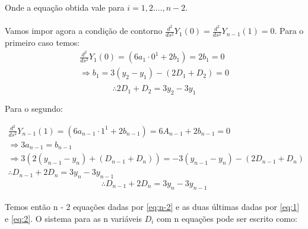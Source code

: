 Onde a equação obtida vale para $i = 1,2. \ldots, n-2$. 

\paragraph{}Vamos impor agora a condição de contorno 
$\frac{d^2}{ds^2}Y_{1}(0) = \frac{d^2}{ds^2}Y_{n-1}(1) = 0$.
Para o primeiro caso temos:
\begin{equation}
\begin{array}{l}
	\frac{d^2}{ds^2}Y_1(0) = \left( 6a_1 \cdot 0^1 + 2b_1 \right) = 2b_1 = 0 \\
	\Rightarrow b_1 = 3(y_2 - y_1) - (2D_1 + D_2) = 0 \\
\end{array}
\end{equation}
\begin{equation}
	\therefore 2D_1 + D_2 =  3y_2 - 3y_1
	\label{eq:1}
\end{equation}


Para o segundo:

\begin{equation}
\begin{array}{l}
	\frac{d^2}{ds^2}Y_{n-1}(1) = \left( 6a_{n-1} \cdot 1^1 + 
	2b_{n-1} \right) = 6A_{n-1} + 2b_{n-1} = 0 \\
	\Rightarrow 3a_{n-1} = b_{n-1} \\
	\Rightarrow 3(2(y_{n-1} - y_{n}) + (D_{n-1} + D_{n})) =
	-3(y_{n-1} - y_{n}) - (2D_{n-1} + D_{n})\\
	\therefore D_{n-1} + 2D_{n} = 3y_{n} - 3y_{n-1}
\end{array}
\end{equation}
\begin{equation}
	\therefore D_{n-1} + 2D_{n} = 3y_{n} - 3y_{n-1}
	\label{eq:2}
\end{equation}

\paragraph{}Temos então n - 2 equações dadas por \ref{eq:n-2} e as duas últimas
dadas por \ref{eq:1} e \ref{eq:2}. O sistema para as n variáveis $D_i$ com n equações
pode ser escrito como:

